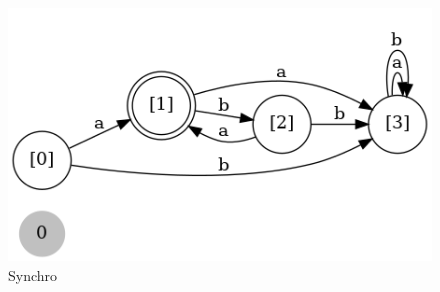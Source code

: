 \documentclass[]{article}
\begin{document}
\begin{enumerate}
\begin{figure}[htbp]
            \centering
            \includegraphics[width=15cm]{automateSynchro.png}
            \caption{Synchro}\label{fig:3.1}
        \end{figure}\\
    \end{enumerate}
    \setcounter{section}{0}
\end{document}
